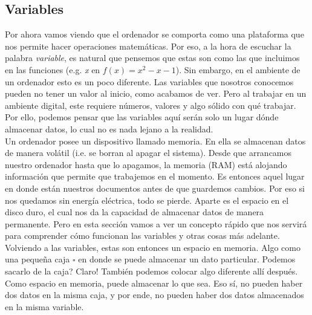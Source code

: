 \documentclass[10pt,letterpaper]{article}
\begin{document}
\subsection{Variables}
Por ahora vamos viendo que el ordenador se comporta como una plataforma que nos permite hacer operaciones matem\'aticas. Por eso, a la hora de escuchar la palabra \emph{variable}, es natural que pensemos que estas son como las que incluimos en las funciones (e.g. \emph{x} en $ f \left( x \right) = x^{2} - x - 1 $). Sin embargo, en el ambiente de un ordenador esto es un poco diferente. Las variables que nosotros conocemos pueden no tener un valor al inicio, como acabamos de ver. Pero al trabajar en un ambiente digital, este requiere n\'umeros, valores y algo s\'olido con qu\'e trabajar. Por ello, podemos pensar que las variables aqu\'i ser\'an solo un lugar d\'onde almacenar datos, lo cual no es nada lejano a la realidad.\\

Un ordenador posee un dispositivo llamado memoria. En ella se almacenan datos de manera vol\'atil (i.e. se borran al apagar el sistema). Desde que arrancamos nuestro ordenador hasta que lo apagamos, la memoria (RAM) est\'a alojando informaci\'on que permite que trabajemos en el momento. Es entonces aquel lugar en donde est\'an nuestros documentos antes de que guardemos cambios. Por eso si nos quedamos sin energ\'ia el\'ectrica, todo se pierde. Aparte es el espacio en el disco duro, el cual nos da la capacidad de almacenar datos de manera permanente. Pero en esta secci\'on vamos a ver un concepto r\'apido que nos servir\'a para comprender c\'omo funcionan las variables y otras cosas m\'as adelante.\\

Volviendo a las variables, estas son entonces un espacio en memoria. Algo como una peque\~na caja $ \square $ en donde se puede almacenar un dato particular. Podemos sacarlo de la caja? Claro! Tambi\'en podemos colocar algo diferente all\'i despu\'es. Como espacio en memoria, puede almacenar lo que sea. Eso s\'i, no pueden haber dos datos en la misma caja, y por ende, no pueden haber dos datos almacenados en la misma variable.\\
\end{document}
